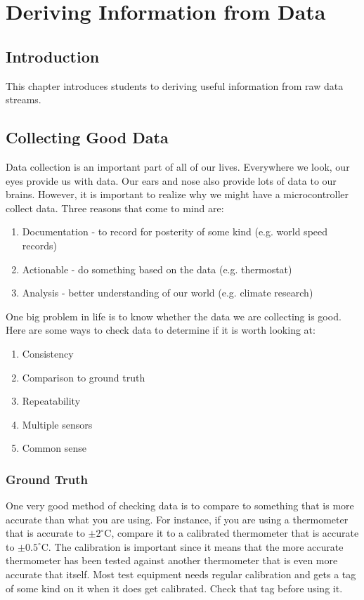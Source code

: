 \chapter{Deriving Information from Data}

\section{Introduction}
This chapter introduces students to deriving useful information from raw data streams.

\section{Collecting Good Data}
Data collection is an important part of all of our lives. Everywhere we look, our eyes provide
us with data. Our ears and nose also provide lots of data to our brains. However, it is important
to realize why we might have a microcontroller collect data. Three reasons that come to mind are:
\begin{enumerate}
    \item Documentation - to record for posterity of some kind (e.g. world speed records)
    \item Actionable - do something based on the data (e.g. thermostat)
    \item Analysis - better understanding of our world (e.g. climate research)
\end{enumerate}

One big problem in life is to know whether the data we are collecting is good. Here are some
ways to check data to determine if it is worth looking at:
\begin{enumerate}
    \item Consistency
    \item Comparison to ground truth
    \item Repeatability
    \item Multiple sensors
    \item Common sense
\end{enumerate}


\subsection{Ground Truth}
One very good method of checking data is to compare to something that is more accurate than 
what you are using. For instance, if you are using a thermometer that is accurate to $\pm2^\circ$C,
compare it to a calibrated thermometer that is accurate to $\pm0.5^\circ$C. The calibration is 
important since it means that the more accurate thermometer has been tested against another
thermometer that is even more accurate that itself. Most test equipment needs regular calibration 
and gets a tag of some kind on it when it does get calibrated. Check that tag before using it.

